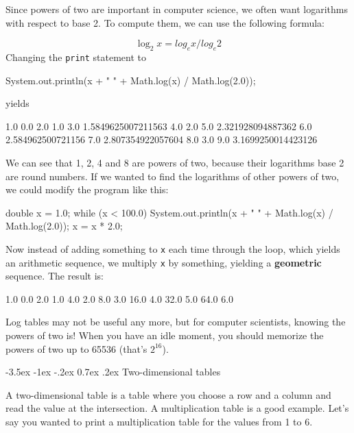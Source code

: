 \documentclass{book}
\makeatletter
\renewcommand{\section}{\@startsection 
    {section} {1} {0mm}%
    {-3.5ex \@plus -1ex \@minus -.2ex}%
    {0.7ex \@plus.2ex}%
    {\normalfont\Large\bfseries}}
\makeatother
\begin{document}
Since powers of two are important
in computer science, we often want logarithms with
respect to base 2.  To compute them, we can use the following
formula:

\begin{equation}
\log_2 x = log_e x / log_e 2
\end{equation}
%
Changing the {\tt print} statement to

\begin{verbatimtab}
      System.out.println(x + "   " + Math.log(x) / Math.log(2.0));
\end{verbatimtab}
%
yields

\begin{verbatimtab}
1.0   0.0
2.0   1.0
3.0   1.5849625007211563
4.0   2.0
5.0   2.321928094887362
6.0   2.584962500721156
7.0   2.807354922057604
8.0   3.0
9.0   3.1699250014423126
\end{verbatimtab}
%
We can see that 1, 2, 4 and 8 are powers of two, because
their logarithms base 2 are round numbers.  If we wanted to find
the logarithms of other powers of two, we could modify the
program like this:

\begin{verbatimtab}
    double x = 1.0;
    while (x < 100.0) {
      System.out.println(x + "   " + Math.log(x) / Math.log(2.0));
      x = x * 2.0;
    }
\end{verbatimtab}
%
Now instead of adding something to {\tt x} each time through
the loop, which yields an arithmetic sequence, we multiply
{\tt x} by something, yielding a {\bf geometric} sequence.
The result is:

\begin{verbatimtab}
1.0   0.0
2.0   1.0
4.0   2.0
8.0   3.0
16.0   4.0
32.0   5.0
64.0   6.0
\end{verbatimtab}
%
Log tables may not be useful any more, but for computer scientists,
knowing the powers of two is!  When you have an idle
moment, you should memorize the powers of two up to 65536
(that's $2^{16}$).


\section{Two-dimensional tables}

A two-dimensional table is a table where you choose a row and
a column and read the value at the intersection.  A multiplication
table is a good example.  Let's say you wanted to print a
multiplication table for the values from 1 to 6.
\end{document}
